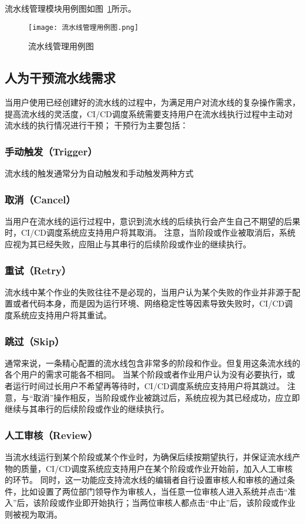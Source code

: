 流水线管理模块用例图如图~\ref{fig:流水线管理用例图}所示。

\begin{figure}[h]
  \centering
  \texttt{[image: 流水线管理用例图.png]}
  \caption{流水线管理用例图}
  \label{fig:流水线管理用例图}
\end{figure}

\subsection{人为干预流水线需求}
当用户使用已经创建好的流水线的过程中，为满足用户对流水线的复杂操作需求，提高流水线的灵活度，CI/CD调度系统需要支持用户在流水线执行过程中主动对流水线的执行情况进行干预；
干预行为主要包括：

\subsubsection{手动触发（Trigger）}
流水线的触发通常分为自动触发和手动触发两种方式

\subsubsection{取消（Cancel）}
当用户在流水线的运行过程中，意识到流水线的后续执行会产生自己不期望的后果时，CI/CD调度系统应支持用户将其取消。
注意，当阶段或作业被取消后，系统应视为其已经失败，应阻止与其串行的后续阶段或作业的继续执行。

\subsubsection{重试（Retry）}
流水线中某个作业的失败往往不是必现的，当用户认为某个失败的作业并非源于配置或者代码本身，而是因为运行环境、网络稳定性等因素导致失败时，CI/CD调度系统应支持用户将其重试。

\subsubsection{跳过（Skip）}
通常来说，一条精心配置的流水线包含非常多的阶段和作业。但复用这条流水线的各个用户的需求可能各不相同。
当某个阶段或者作业用户认为没有必要执行，或者运行时间过长用户不希望再等待时，CI/CD调度系统应支持用户将其跳过。
注意，与“取消”操作相反，当阶段或作业被跳过后，系统应视为其已经成功，应立即继续与其串行的后续阶段或作业的继续执行。

\subsubsection{人工审核（Review）}
当流水线运行到某个阶段或某个作业时，为确保后续按期望执行，并保证流水线产物的质量，CI/CD调度系统应支持用户在某个阶段或作业开始前，加入人工审核的环节。
同时，这一功能应支持流水线的编辑者自行设置审核人和审核的通过条件，比如设置了两位部门领导作为审核人，当任意一位审核人进入系统并点击“准入”后，该阶段或作业即开始执行；当两位审核人都点击“中止”后，该阶段或作业则被视为取消。


